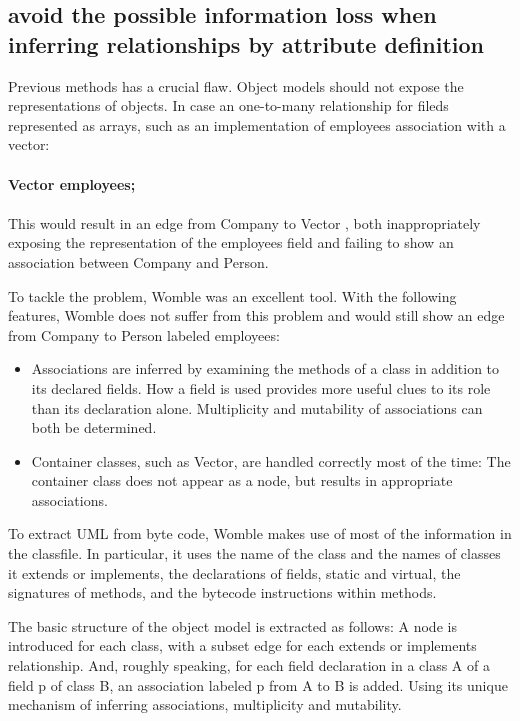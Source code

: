 \documentclass[acmsmall]{acmart}
\begin{document}
\subsection{avoid the possible information loss when inferring relationships by attribute definition}


Previous methods has a crucial flaw.  Object models should not expose the representations of objects.
In case an one-to-many relationship for fileds represented as arrays, such as
an implementation of employees association with a vector:
\\
\\
\textbf{Vector employees;}
\\
\\This would result in an edge from Company to Vector , both
inappropriately exposing the representation of the
employees field and failing to show an association between
Company and Person.


To tackle the problem, Womble was an excellent tool\cite{2001Lightweight}.
With the following features, Womble does not suffer from this problem and
would still show an edge from Company to Person labeled
employees:
\begin{itemize}
    \item Associations are inferred by examining the methods
    of a class in addition to its declared fields. How a
    field is used provides more useful clues to its role
    than its declaration alone. Multiplicity and mutability of associations can both be determined.
    \item Container classes, such as Vector, are handled
    correctly most of the time: The container class does
    not appear as a node, but results in appropriate associations.
\end{itemize}


To extract UML from byte code, Womble makes use of most of the information in the
classfile. In particular, it uses the name of the class and the
names of classes it extends or implements, the declarations
of fields, static and virtual, the signatures of methods, and
the bytecode instructions within methods.


The basic structure of the object model is extracted as
follows: A node is introduced for each class, with a subset
edge for each extends or implements relationship. And,
roughly speaking, for each field declaration in a class A
of a field p of class B, an association labeled p from
A to B is added. Using its unique mechanism of inferring associations,
multiplicity and mutability.
\end{document}
